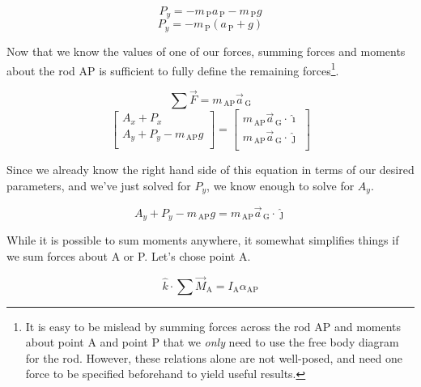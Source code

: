 \documentclass[nofoot,pdf-a,balance,colorlinks,upint,subscriptcorrection,varvw,mathalfa=cal=boondoxo]{asmeconf}
\begin{document}
    \begin{equation}
        P_y = -m_{\,\textrm{P}}a_{\,\textrm{P}} -  m_{\,\textrm{P}}g
    \end{equation}
    \begin{equation}
        P_y = -m_{\,\textrm{P}}\left(a_{\,\textrm{P}} +  g\right)
    \end{equation}

    

    Now that we know the values of one of our forces, summing forces and moments about the rod AP is sufficient to fully define the remaining forces\footnote{It is easy to be mislead by summing forces across the rod AP and moments about point A and point P that we \textit{only} need to use the free body diagram for the rod. However, these relations alone are not well-posed, and need one force to be specified beforehand to yield useful results.}.

    \begin{equation}
        \sum{\vec{F}} = m_{\,\textrm{AP}}\vec{a}_{\,\textrm{G}}
    \end{equation}
    \begin{equation}
        \begin{bmatrix}
            A_x + P_x \\
            A_y + P_y - m_{\,\textrm{AP}}g \\
        \end{bmatrix} = 
        \begin{bmatrix}
            m_{\,\textrm{AP}}\vec{a}_{\,\textrm{G}} \cdot \hat{\imath} \\
            m_{\,\textrm{AP}}\vec{a}_{\,\textrm{G}} \cdot \hat{\jmath} \\
        \end{bmatrix}
    \end{equation}

    Since we already know the right hand side of this equation in terms of our desired parameters, and we've just solved for $P_y$, we know enough to solve for $A_y$.

    \begin{equation} 
        A_y + P_y - m_{\,\textrm{AP}}g  = m_{\,\textrm{AP}}\vec{a}_{\,\textrm{G}} \cdot \hat{\jmath}
    \end{equation}

    While it is possible to sum moments anywhere, it somewhat simplifies things if we sum forces about A or P. Let's chose point A.

    \begin{equation}
        \hat{k}\cdot\sum{\vec{M}_{\textrm{A}}} = I_{\textrm{A}}\alpha_{\textrm{AP}}
    \end{equation}
\end{document}
